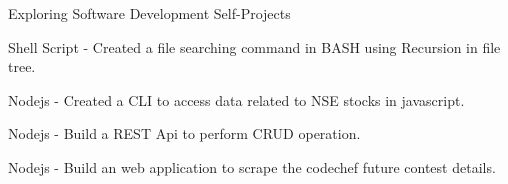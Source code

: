 \begin{cventries}
  \cventry
  {Exploring Software Development}
  {Self-Projects}
  {}
  {}
  {
    \begin{cvitems}
      \item Shell Script - Created a file searching command in BASH using Recursion in file tree.
      \item Nodejs - Created a CLI to access data related to NSE stocks in javascript.
      \item Nodejs - Build a REST Api to perform CRUD operation.
      \item Nodejs - Build an web application to scrape the codechef future contest details.   
    \end{cvitems}
  }
\end{cventries}

